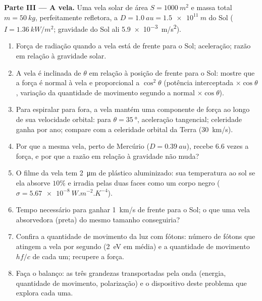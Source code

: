\begin{problem}
\medskip
\noindent\textbf{Parte III --- A vela.}
Uma vela solar de área $S = \qty{1000}{m^2}$ e massa total $m = \qty{50}{kg}$,
perfeitamente refletora, a $D = \qty{1.0}{au} = \qty{1.5e11}{m}$ do Sol
($I = \qty{1.36}{kW/m^2}$; gravidade do Sol ali \qty{5.9e-3}{m/s^2}).
\begin{enumerate}[resume]
  \item Força de radiação quando a vela está de frente para o Sol; aceleração;
        razão em relação à gravidade solar.
  \item A vela é inclinada de $\theta$ em relação à posição de frente para o Sol: mostre que a
        força é normal à vela e proporcional a $\cos^2\theta$
        (potência interceptada $\times\cos\theta$, variação da quantidade de movimento segundo a
        normal $\times\cos\theta$).
  \item Para espiralar para fora, a vela mantém uma componente de força ao longo de sua
        velocidade orbital: para $\theta = \qty{35}{\degree}$, aceleração
        tangencial; celeridade ganha por ano; compare com a celeridade
        orbital da Terra (\qty{30}{km/s}).
  \item Por que a mesma vela, perto de Mercúrio ($D = \qty{0.39}{au}$), recebe
        $6.6$ vezes a força, e por que a razão em relação à gravidade
        não muda?
  \item O filme da vela tem \qty{2}{\micro m} de plástico aluminizado: sua
        temperatura ao sol se ela absorve $10\%$ e irradia pelas
        duas faces como um corpo negro ($\sigma = \qty{5.67e-8}{W.m^{-2}.K^{-4}}$).
  \item Tempo necessário para ganhar \qty{1}{km/s} de frente para o Sol; o que uma
        vela absorvedora (preta) do mesmo tamanho conseguiria?
  \item Confira a quantidade de movimento da luz com fótons: número de fótons
        que atingem a vela por segundo (\qty{2}{eV} em média) e a
        quantidade de movimento $hf/c$ de cada um; recupere a força.
  \item Faça o balanço: as três grandezas transportadas pela onda (energia,
        quantidade de movimento, polarização) e o dispositivo deste problema que
        explora cada uma.
\end{enumerate}
\end{problem}
